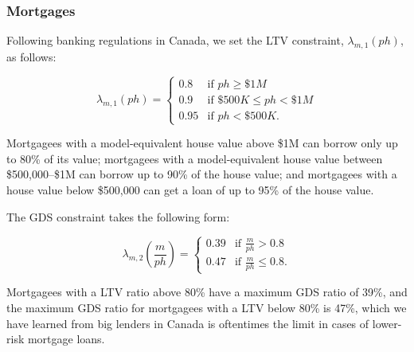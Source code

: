 \documentclass[parskip=full]{article}
\begin{document}
\subsubsection{Mortgages}

Following banking regulations in Canada, we set the LTV constraint, $\lambda_{m,1}(ph)$, as follows:

\begin{equation*}
\lambda_{m,1}(ph) = \begin{cases}
0.8 &\text{if $ph\geq \$1M$}\\
0.9 &\text{if $\$500K\leq ph< \$1M$}\\
0.95 &\text{if $ph < \$500K$}.
\end{cases}
\end{equation*}

\noindent Mortgagees with a model-equivalent house value above \$1M can borrow only up to 80\% of its value; mortgagees with a model-equivalent house value between \$500,000--\$1M can borrow up to 90\% of the house value; and mortgagees with a house value below \$500,000 can get a loan of up to 95\% of the house value. 

The GDS constraint takes the following form:

\begin{equation*}
\lambda_{m,2}\left(\frac{m}{ph}\right) = \begin{cases}
0.39 &\text{if $\frac{m}{ph}>0.8$}\\
0.47 &\text{if $\frac{m}{ph}\leq 0.8$}.
\end{cases}
\end{equation*}

\noindent Mortgagees with a LTV ratio above 80\% have a maximum GDS ratio of 39\%, and the maximum GDS ratio for mortgagees with a LTV below 80\% is 47\%, which we have learned from big lenders in Canada is oftentimes the limit in cases of lower-risk mortgage loans. 
\end{document}
